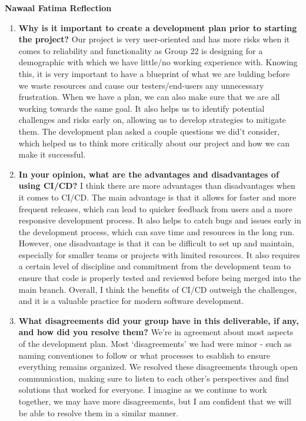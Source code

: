 \documentclass{article}
\begin{document}
\textbf{Nawaal Fatima Reflection}
\begin{enumerate}
    \item  \textbf{Why is it important to create a development plan prior to starting the
    project?} \newline
    Our project is very user-oriented and has more risks when it comes to reliability and functionality as Group 22 is designing for a demographic with which we have little/no working experience with.
    Knowing this, it is very important to have a blueprint of what we are bulding before we waste resources and cause our testers/end-users any unnecessary frustration. 
    When we have a plan, we can also make sure that we are all working towards the same goal. It also helps us to identify potential challenges and risks early on, allowing us to develop strategies to mitigate them.
    The development plan asked a couple questions we did't consider, which helped us to think more critically about our project and how we can make it successful.
    
    \item \textbf{In your opinion, what are the advantages and disadvantages of using
    CI/CD?} \newline
    I think there are more advantages than disadvantages when it comes to CI/CD.
    The main advantage is that it allows for faster and more frequent releases, which can lead to quicker feedback from users and a more responsive development process.
    It also helps to catch bugs and issues early in the development process, which can save time and resources in the long run.
    However, one disadvantage is that it can be difficult to set up and maintain, especially for smaller teams or projects with limited resources.
    It also requires a certain level of discipline and commitment from the development team to ensure that code is properly tested and reviewed before being merged into the main branch.
    Overall, I think the benefits of CI/CD outweigh the challenges, and it is a valuable practice for modern software development.

    \item \textbf{What disagreements did your group have in this deliverable, if any,
    and how did you resolve them?}\newline
    We're in agreement about most aspects of the development plan. Most `disagreements' we had were minor - such as naming conventiones to follow or what processes to esablish to ensure everything remains organized.
    We resolved these disagreements through open communication, making sure to listen to each other's perspectives and find solutions that worked for everyone.
    I imagine as we continue to work together, we may have more disagreements, but I am confident that we will be able to resolve them in a similar manner.

\end{enumerate}
\end{document}
